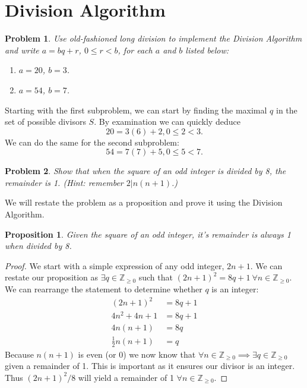 \documentclass[12pt]{article}
\newtheorem*{prop}{Proposition}
\newtheorem{problem}{Problem}
\theoremstyle{remark}  %
\begin{document}
 
%
\rhead{\today}
\section{Division Algorithm}

\setcounter{problem}{4}
    \begin{problem}
        Use old-fashioned long division to implement the Division Algorithm and write $a=bq+r$, $0\leq r<b$, for each $a$ and $b$ listed below:
        \begin{enumerate}[label=(\alph*)]
            \item $a=20$, $b=3$.
            \item $a=54$, $b=7$.
        \end{enumerate}
    \end{problem}
    Starting with the first subproblem, we can start by finding the maximal $q$ in the set of possible divisors $S$. By examination we can quickly deduce $$\boxed{20 = 3(6) + 2, 0 \leq 2 < 3.}$$ We can do the same for the second subproblem: $$\boxed{54 = 7(7) + 5, 0 \leq 5 < 7.}$$
\vspace{.5em}
\setcounter{problem}{7}
    \begin{problem}
        Show that when the square of an odd integer is divided by 8, the remainder is 1. (Hint: remember $2|n(n+1)$.)
    \end{problem}
    We will restate the problem as a proposition and prove it using the Division Algorithm.
    \begin{prop}
        Given the square of an odd integer, it's remainder is always 1 when divided by 8.
    \end{prop}
    \begin{proof}
        We start with a simple expression of any odd integer, $2n+1$. We can restate our proposition as $\exists q \in \mathbb{Z}_{\geq 0}$ such that $(2n+1)^2=8q+1 \ \forall n\in\mathbb{Z}_{\geq 0}$. We can rearrange the statement to determine whether $q$ is an integer:
        \begin{align*}
            (2n+1)^2 &= 8q+1 \\
            4n^2+4n+1 &= 8q+1 \\
            4n(n+1) &= 8q \\
            \frac{1}{2}n(n+1) &= q
        \end{align*}
        Because $n(n+1)$ is even (or 0) we now know that $\forall n\in \mathbb{Z}_{\geq0} \implies \exists q\in \mathbb{Z}_{\geq0}$ given a remainder of 1. This is important as it ensures our divisor is an integer. Thus $(2n+1)^2/8$ will yield a remainder of 1 $\forall n\in \mathbb{Z}_{\geq0}$.
    \end{proof}
\end{document}
